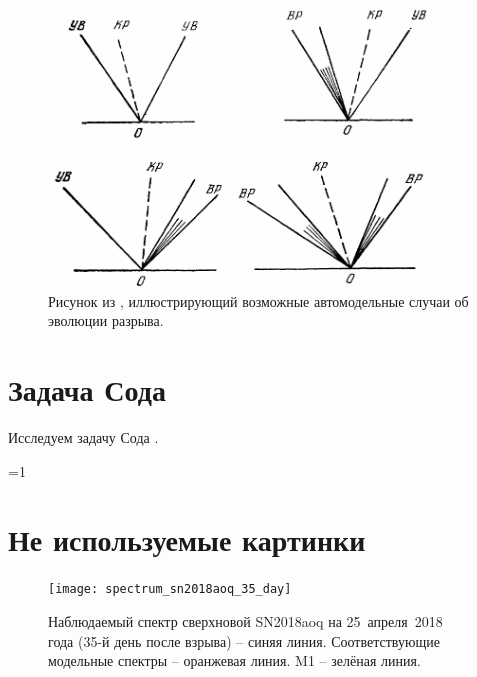 \documentclass[a4paper,12pt]{extarticle}
\newcounter{basement}
\begin{document}
%
\begin{figure}[!htb]
	\centering
	\includegraphics[width=0.9\textwidth]{godunov1976_fig13-1}
	\caption{
		Рисунок из \cite{godunov1976}, иллюстрирующий возможные автомодельные случаи об эволюции разрыва.
	}
	\label{fig:godunov1976_fig13-1}
\end{figure}


\section{Задача Сода }

Исследуем задачу Сода \cite{sod1978}.




\clearpage
\sloppy
\printbibliography


\ifnum \value{basement}=1

\newpage


\section*{Не используемые картинки}


%
\begin{figure}[!htb]
	\centering
	\texttt{[image: spectrum\_sn2018aoq\_35\_day]}
	\caption{
		Наблюдаемый спектр сверхновой SN2018aoq
		на 25~апреля~2018 года (35-й день после взрыва) -- синяя линия.
		Соответствующие модельные спектры
		\tardis -- оранжевая линия.
		M1 -- зелёная линия.
	}
	\label{fig:spectrum_sn2018aoq_35_day}
\end{figure}

\fi
\end{document}
